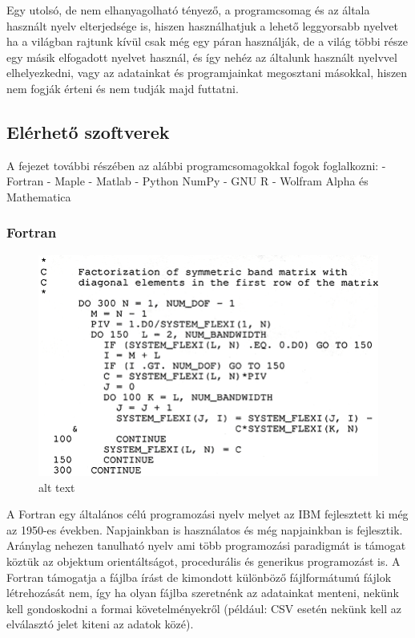 Egy utolsó, de nem elhanyagolható tényező, a programcsomag és az általa
használt nyelv elterjedsége is, hiszen használhatjuk a lehető
leggyorsabb nyelvet ha a világban rajtunk kívül csak még egy páran
használják, de a világ többi része egy másik elfogadott nyelvet használ,
és így nehéz az általunk használt nyelvvel elhelyezkedni, vagy az
adatainkat és programjainkat megosztani másokkal, hiszen nem fogják
érteni és nem tudják majd futtatni.

    \subsection{Elérhető szoftverek}\label{eluxe9rhetux151-szoftverek}

    A fejezet további részében az alábbi programcsomagokkal fogok
foglalkozni: - Fortran - Maple - Matlab - Python NumPy - GNU R - Wolfram
Alpha és Mathematica

    \subsubsection{Fortran}\label{fortran}

    \begin{figure}
\centering
\includegraphics{img/FORTRAN_code_example.png}
\caption{alt text}
\end{figure}

A Fortran egy általános célú programozási nyelv melyet az IBM
fejlesztett ki még az 1950-es években. Napjainkban is használatos és még
napjainkban is fejlesztik. Aránylag nehezen tanulható nyelv ami több
programozási paradigmát is támogat köztük az objektum orientáltságot,
procedurális és generikus programozást is. A Fortran támogatja a fájlba
írást de kimondott különböző fájlformátumú fájlok létrehozását nem, így
ha olyan fájlba szeretnénk az adatainkat menteni, nekünk kell
gondoskodni a formai követelményekről (például: CSV esetén nekünk kell
az elválasztó jelet kiteni az adatok közé).

